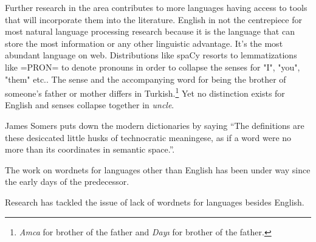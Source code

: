 Further research in the area contributes to more languages having access to tools that will incorporate them into the literature.
English in not the centrepiece for most natural language processing research because it is the language that can store the most information or any other linguistic advantage.
It's the most abundant language on web.
Distributions like spaCy resorts to lemmatizations like =PRON= to denote pronouns in order to collapse the senses for "I", "you", "them" etc.\@.
The sense and the accompanying word for being the brother of someone's father or mother differs in Turkish.\footnote{\emph{Amca} for brother of the father and \emph{Dayı} for brother of the father.}
Yet no distinction exists for English and senses collapse together in \emph{uncle}.


James Somers puts down the modern dictionaries by saying \enquote{The definitions are these desiccated little husks of technocratic meaningese, as if a word were no more than its coordinates in semantic space.}\cite{somers_youre_2014}.

The work on wordnets for languages other than English has been under way since the early days of the predecessor.

Research has tackled the issue of lack of wordnets for languages besides English. %

